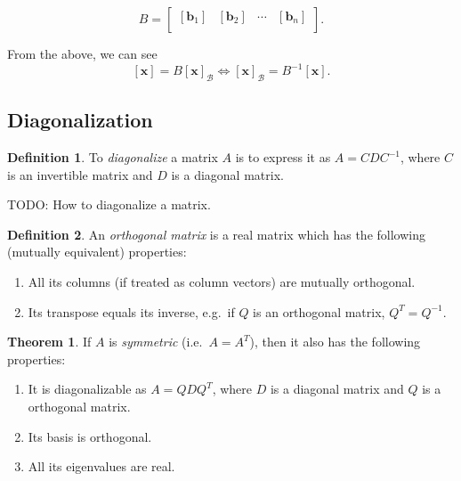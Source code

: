 \documentclass[a4paper]{article}
\numberwithin{equation}{subsection}
\theoremstyle{definition}
\newtheorem{definition}{Definition}[section]
\newtheorem{theorem}{Theorem}[section]
\theoremstyle{remark}
\newenvironment{definitionSR}
{
\begin{siderules}
\begin{definition}
}
{
\end{definition}
\end{siderules}
}
\newenvironment{theoremSR}
{
\begin{siderules}
\begin{theorem}
}
{
\end{theorem}
\end{siderules}
}
\newcommand{\ve}[1]{
	\mathbf{#1}
}
\newcommand{\cvb}[1]{
	[\mathbf{#1}]
}
\newcommand{\inv}[1]{
	{#1}^{-1}
}
\begin{document}
\begin{equation}
B = \begin{bmatrix} 
[\ve{b}_1]&[\ve{b}_2]& \cdots & [\ve{b}_n]\\

\end{bmatrix}.
\end{equation}

From the above, we can see
\begin{equation}
\cvb{x} = B\cvb{x}_\mathcal{B} \iff \cvb{x}_\mathcal{B} = \inv{B}\cvb{x}.
\end{equation}

\subsection{Diagonalization}
\begin{definitionSR}
To \textit{diagonalize} a matrix $A$ is to express it as $A=CD\inv{C}$, where $C$ is an invertible matrix and $D$ is a diagonal matrix.
\end{definitionSR}
TODO: How to diagonalize a matrix.

\begin{definitionSR}
An \textit{orthogonal matrix} is a real matrix which has the following (mutually equivalent) properties:
\begin{enumerate}
\item All its columns (if treated as column vectors) are mutually orthogonal.
\item Its transpose equals its inverse, e.g.\ if $Q$ is an orthogonal matrix, $Q^T = \inv{Q}$.
\end{enumerate}

\end{definitionSR}

\begin{theoremSR}
	If $A$ is \textit{symmetric} (i.e.\ $A = A^T$), then it also has the following properties:
	\begin{enumerate}
	\item It is diagonalizable as $A=QDQ^T$, where $D$ is a diagonal matrix and $Q$ is a orthogonal matrix.
	\item Its basis is orthogonal.
	\item All its eigenvalues are real.
	\end{enumerate}
\end{theoremSR}
\end{document}
